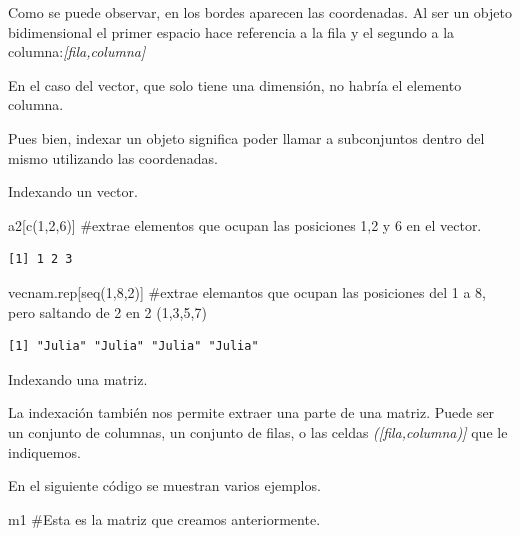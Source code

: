 \documentclass[
  letterpaper,
  DIV=11,
  numbers=noendperiod]{scrreprt}
\newenvironment{Shaded}{\begin{snugshade}}{\end{snugshade}}
\newcommand{\CommentTok}[1]{\textcolor[rgb]{0.37,0.37,0.37}{#1}}
\newcommand{\DecValTok}[1]{\textcolor[rgb]{0.68,0.00,0.00}{#1}}
\newcommand{\FunctionTok}[1]{\textcolor[rgb]{0.28,0.35,0.67}{#1}}
\newcommand{\NormalTok}[1]{\textcolor[rgb]{0.00,0.23,0.31}{#1}}
\begin{document}
Como se puede observar, en los bordes aparecen las coordenadas. Al ser
un objeto bidimensional el primer espacio hace referencia a la fila y el
segundo a la columna:\emph{{[}fila,columna{]}}

En el caso del vector, que solo tiene una dimensión, no habría el
elemento columna.

Pues bien, indexar un objeto significa poder llamar a subconjuntos
dentro del mismo utilizando las coordenadas.

Indexando un vector.

\begin{Shaded}
\begin{Highlighting}[]
\NormalTok{a2[}\FunctionTok{c}\NormalTok{(}\DecValTok{1}\NormalTok{,}\DecValTok{2}\NormalTok{,}\DecValTok{6}\NormalTok{)] }\CommentTok{\#extrae elementos que ocupan las posiciones 1,2 y 6 en el vector.}
\end{Highlighting}
\end{Shaded}

\begin{verbatim}
[1] 1 2 3
\end{verbatim}

\begin{Shaded}
\begin{Highlighting}[]
\NormalTok{vecnam.rep[}\FunctionTok{seq}\NormalTok{(}\DecValTok{1}\NormalTok{,}\DecValTok{8}\NormalTok{,}\DecValTok{2}\NormalTok{)] }\CommentTok{\#extrae elemantos que ocupan las posiciones del 1 a 8, pero saltando de 2 en 2 (1,3,5,7)}
\end{Highlighting}
\end{Shaded}

\begin{verbatim}
[1] "Julia" "Julia" "Julia" "Julia"
\end{verbatim}

Indexando una matriz.

La indexación también nos permite extraer una parte de una matriz. Puede
ser un conjunto de columnas, un conjunto de filas, o las celdas
\emph{({[}fila,columna){]}} que le indiquemos.

En el siguiente código se muestran varios ejemplos.

\begin{Shaded}
\begin{Highlighting}[]
\NormalTok{m1 }\CommentTok{\#Esta es la matriz que creamos anteriormente.}
\end{Highlighting}
\end{Shaded}
\end{document}
